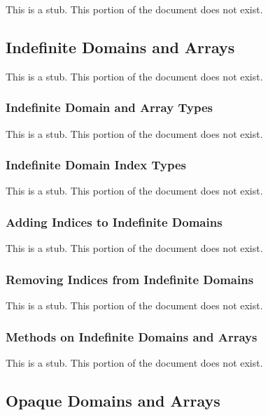 This is a stub.  This portion of the document does not exist.

\subsection{Indefinite Domains and Arrays}
\label{Indefinite_Domains_and_Arrays}

This is a stub.  This portion of the document does not exist.

\subsubsection{Indefinite Domain and Array Types}
\label{Indefinite_Domain_and_Array_Types}

This is a stub.  This portion of the document does not exist.

\subsubsection{Indefinite Domain Index Types}
\label{Indefinite_Domain_Index_Types}

This is a stub.  This portion of the document does not exist.

\subsubsection{Adding Indices to Indefinite Domains}
\label{Adding_Indices_to_Indefinite_Domains}

This is a stub.  This portion of the document does not exist.

\subsubsection{Removing Indices from Indefinite Domains}
\label{Removing_Indices_from_Indefinite_Domains}

This is a stub.  This portion of the document does not exist.

\subsubsection{Methods on Indefinite Domains and Arrays}
\label{Methods_on_Indefinite_Domains_and_Arrays}

This is a stub.  This portion of the document does not exist.

\subsection{Opaque Domains and Arrays}
\label{Opaque_Domains_and_Arrays}

